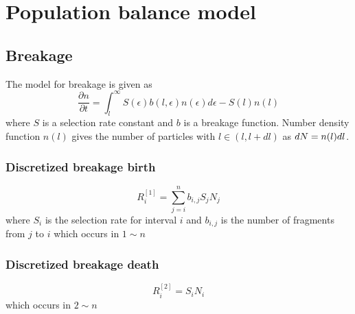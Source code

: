 \documentclass[12pt]{article}
\begin{document}
\section{Population balance model}
\subsection{Breakage}
The model for breakage is given as
\begin{equation*}
\frac{\partial n}{\partial t}=\int_l^\infty S(\epsilon)b(l,\epsilon)n(\epsilon)d\epsilon-S(l)n(l)
\end{equation*}
where $S$ is a selection rate constant and $b$ is a breakage function. Number density function $n(l)$ gives the number of particles with $l\in(l,l+dl)$ as $dN=n(l)dl\\$.

\subsubsection{Discretized breakage birth}
\begin{equation}
R_i^{[1]}=\sum_{j=i}^{n}b_{i,j}S_jN_j
\end{equation}
where $S_i$ is the selection rate for interval $i$ and $b_{i,j}$ is the number of fragments from $j$ to $i$ which occurs in $1\sim n$
\subsubsection{Discretized breakage death}
\begin{equation}
R_i^{[2]}=S_iN_i
\end{equation}
which occurs in $2\sim n$
\end{document}
